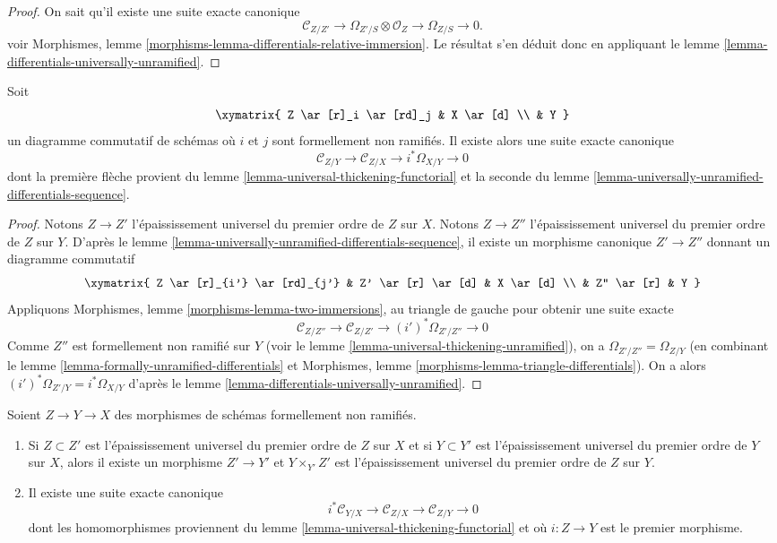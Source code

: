 \begin{proof}
On sait qu'il existe une suite exacte canonique
$$
\mathcal{C}_{Z/Z'} \to
\Omega_{Z'/S} \otimes \mathcal{O}_Z \to
\Omega_{Z/S} \to 0.
$$
voir
Morphismes, lemme \ref{morphisms-lemma-differentials-relative-immersion}.
Le résultat s'en déduit donc en appliquant
le lemme \ref{lemma-differentials-universally-unramified}.
\end{proof}

\begin{lemma}
\label{lemma-two-unramified-morphisms}
Soit
$$
\xymatrix{
Z \ar[r]_i \ar[rd]_j & X \ar[d] \\
& Y
}
$$
un diagramme commutatif de schémas où $i$ et $j$ sont formellement
non ramifiés. Il existe alors une suite exacte canonique
$$
\mathcal{C}_{Z/Y} \to
\mathcal{C}_{Z/X} \to
i^*\Omega_{X/Y} \to 0
$$
dont la première flèche provient du
lemme \ref{lemma-universal-thickening-functorial}
et la seconde du
lemme \ref{lemma-universally-unramified-differentials-sequence}.
\end{lemma}

\begin{proof}
Notons $Z \to Z'$ l'épaississement universel du premier ordre de $Z$ sur $X$.
Notons $Z \to Z''$ l'épaississement universel du premier ordre de $Z$ sur $Y$.
D'après
le lemme \ref{lemma-universally-unramified-differentials-sequence},
il existe un morphisme canonique $Z' \to Z''$ donnant un diagramme
commutatif
$$
\xymatrix{
Z \ar[r]_{i'} \ar[rd]_{j'} & Z' \ar[r] \ar[d] & X \ar[d] \\
& Z'' \ar[r] & Y
}
$$
Appliquons
Morphismes, lemme \ref{morphisms-lemma-two-immersions},
au triangle de gauche pour obtenir une suite exacte
$$
\mathcal{C}_{Z/Z''} \to
\mathcal{C}_{Z/Z'} \to
(i')^*\Omega_{Z'/Z''} \to 0
$$
Comme $Z''$ est formellement non ramifié sur $Y$ (voir
le lemme \ref{lemma-universal-thickening-unramified}),
on a
$\Omega_{Z'/Z''} = \Omega_{Z/Y}$ (en combinant
le lemme \ref{lemma-formally-unramified-differentials}
et
Morphismes, lemme \ref{morphisms-lemma-triangle-differentials}).
On a alors $(i')^*\Omega_{Z'/Y} = i^*\Omega_{X/Y}$ d'après
le lemme \ref{lemma-differentials-universally-unramified}.
\end{proof}

\begin{lemma}
\label{lemma-transitivity-conormal}
Soient $Z \to Y \to X$ des morphismes de schémas formellement non ramifiés.
\begin{enumerate}
\item Si $Z \subset Z'$ est l'épaississement universel du premier ordre de $Z$
sur $X$ et si $Y \subset Y'$ est l'épaississement universel du premier ordre de $Y$
sur $X$, alors il existe un morphisme $Z' \to Y'$ et $Y \times_{Y'} Z'$ est
l'épaississement universel du premier ordre de $Z$ sur $Y$.
\item Il existe une suite exacte canonique
$$
i^*\mathcal{C}_{Y/X} \to
\mathcal{C}_{Z/X} \to
\mathcal{C}_{Z/Y} \to 0
$$
dont les homomorphismes proviennent du
lemme \ref{lemma-universal-thickening-functorial}
et où $i : Z \to Y$ est le premier morphisme.
\end{enumerate}
\end{lemma}

